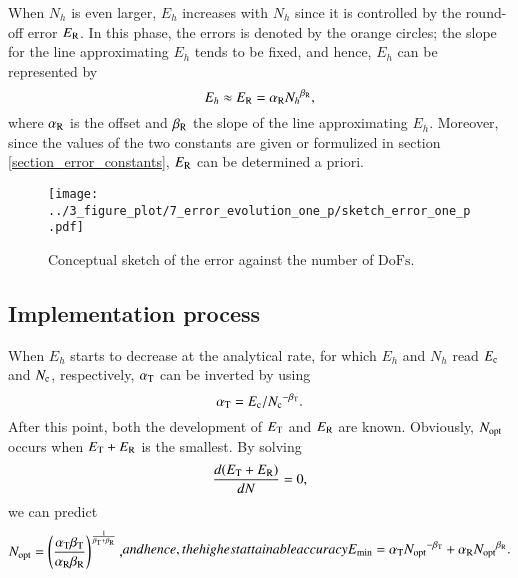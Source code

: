 \documentclass[review,3p]{elsarticle}
\begin{document}
When $N_h$ is even larger, $E_h$ increases with $N_h$ since it is controlled by the round-off error $E_{\rm R}$. In this phase, the errors is denoted by the orange circles; the slope for the line approximating $E_h$ tends to be fixed\cite{Babuska2018Roundoff,WalterFrei}, and hence, $E_h$ can be represented by 
\begin{equation}
 E_{h} \approx E_{\rm R} = \alpha_{\rm R}{N_{h}}^{\beta_{\rm R}},		\label{formula_round-off_error}
\end{equation}
where $\alpha_{\rm R}$ is the offset and $\beta_{\rm R}$ the slope of the line approximating $E_h$. Moreover, since the values of the two constants are given or formulized in section \ref{section_error_constants}, $E_{\rm R}$ can be determined a priori.

 \begin{figure}[!ht]
 \centering
     \texttt{[image: ../3\_figure\_plot/7\_error\_evolution\_one\_p/sketch\_error\_one\_p.pdf]}
     \caption{Conceptual sketch of the error against the number of $\text{DoFs}$.}
     \label{sketch_error_one_p}
 \end{figure}

\subsection{Implementation process}           \label{section_strategy}

When $E_h$ starts to decrease at the analytical rate, for which $E_h$ and $N_h$ read ${E_{\rm c}}$ and ${N_{\rm c}}$, respectively, $\alpha_{\rm T}$ can be inverted by using
\begin{equation}
 \alpha_{\rm T} = {E_{\rm c}}/{N_{\rm c}}^{- \beta_{\rm T}}.		\label{formula_offset_truncation_error}
\end{equation}
After this point, both the development of $E_{\rm T}$ and $E_{\rm R}$ are known. Obviously, $N_{\rm opt}$ occurs when $E_{\rm T}+E_{\rm R}$ is the smallest. By solving
\begin{equation}
    \frac{d(E_{\rm T}+E_{\rm R})}{dN}=0,    \label{derivative_condition_N_opt}
\end{equation}
we can predict
\begin{subequations}
\begin{align}
 N_{\rm opt} = \left( \frac{\alpha_{\rm T} \beta_{\rm T}}{\alpha _{\rm R} \beta_{\rm R}} \right)^{\frac{1}{\beta_{\rm T} + \beta_{\rm R}}},
\end{align}
and hence, the highest attainable accuracy
\begin{align}
 E_{\rm min} = \alpha_{\rm T} {N_{\rm opt}}^{- {\beta _{\rm T}}}+\alpha_{\rm R} {N_{\rm opt}}^{{\beta _{\rm R}}}.
\end{align}
\end{subequations}
\end{document}

